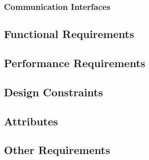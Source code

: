 \documentclass[12pt,a4paper]{article}
\begin{document}
\subsubsection{Communication Interfaces}
\subsection{Functional Requirements}
\subsection{Performance Requirements}
\subsection{Design Constraints}
\subsection{Attributes}
\subsection{Other Requirements}




\end{document}
